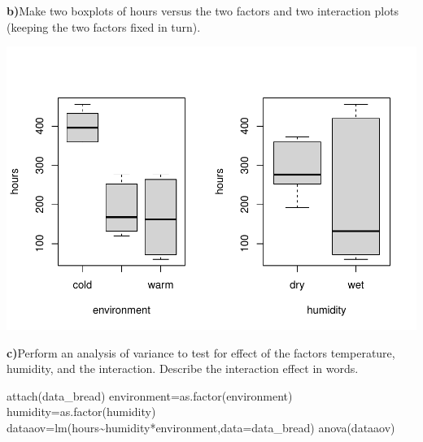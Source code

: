 \documentclass[
  10pt,
]{article}
\newenvironment{Shaded}{\begin{snugshade}}{\end{snugshade}}
\newcommand{\AttributeTok}[1]{\textcolor[rgb]{0.77,0.63,0.00}{#1}}
\newcommand{\DecValTok}[1]{\textcolor[rgb]{0.00,0.00,0.81}{#1}}
\newcommand{\FunctionTok}[1]{\textcolor[rgb]{0.00,0.00,0.00}{#1}}
\newcommand{\NormalTok}[1]{#1}
\newcommand{\OtherTok}[1]{\textcolor[rgb]{0.56,0.35,0.01}{#1}}
\newcommand{\SpecialCharTok}[1]{\textcolor[rgb]{0.00,0.00,0.00}{#1}}
\begin{document}
\textbf{b)}Make two boxplots of hours versus the two factors and two
interaction plots (keeping the two factors fixed in turn).

\begin{Shaded}
\end{Shaded}

\includegraphics{Assignment-2_files/figure-latex/unnamed-chunk-2-1.pdf}

\textbf{c)}Perform an analysis of variance to test for effect of the
factors temperature, humidity, and the interaction. Describe the
interaction effect in words.

\begin{Shaded}
\begin{Highlighting}[]
\FunctionTok{attach}\NormalTok{(data\_bread)}
\NormalTok{environment}\OtherTok{=}\FunctionTok{as.factor}\NormalTok{(environment)}
\NormalTok{humidity}\OtherTok{=}\FunctionTok{as.factor}\NormalTok{(humidity)}
\NormalTok{dataaov}\OtherTok{=}\FunctionTok{lm}\NormalTok{(hours}\SpecialCharTok{\textasciitilde{}}\NormalTok{humidity}\SpecialCharTok{*}\NormalTok{environment,}\AttributeTok{data=}\NormalTok{data\_bread)}
\FunctionTok{anova}\NormalTok{(dataaov)}
\end{Highlighting}
\end{Shaded}
\end{document}
